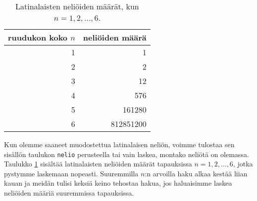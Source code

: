 \begin{table}
\center
\begin{tabular}{rr}
ruudukon koko $n$ & neliöiden määrä \\
\hline
1 & 1 \\
2 & 2 \\
3 & 12 \\
4 & 576 \\
5 & 161280 \\
6 & 812851200 \\
\end{tabular}
\caption{Latinalaisten neliöiden määrät, kun $n=1,2,\dots,6$.}
\label{tab:latnel}
\end{table}

Kun olemme saaneet muodostettua latinalaisen neliön, voimme
tulostaa sen sisällön taulukon \texttt{nelio} perusteella
tai vain laskea, montako neliötä on olemassa.
Taulukko \ref{tab:latnel} sisältää latinalaisten neliöiden
määrät tapauksissa $n=1,2,\dots,6$, jotka pystymme laskemaan nopeasti.
Suuremmilla $n$:n arvoilla haku alkaa kestää liian kauan
ja meidän tulisi keksiä keino tehostaa hakua,
jos haluaisimme laskea neliöiden määriä suuremmissa tapauksissa.
